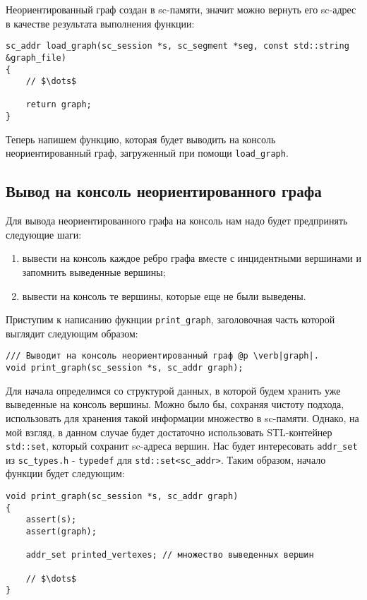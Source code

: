 Неориентированный граф создан в sc-памяти, значит можно вернуть его
sc-адрес в качестве результата выполнения функции:
\begin{lstlisting}[texcl]
sc_addr load_graph(sc_session *s, sc_segment *seg, const std::string &graph_file)
{
    // $\dots$

    return graph;
}
\end{lstlisting}

Теперь напишем функцию, которая будет выводить на консоль
неориентированный граф, загруженный при помощи \lstinline|load_graph|.

\subsection{Вывод на консоль неориентированного графа}
\label{sec:libscprg_print_graph}

Для вывода неориентированного графа на консоль нам надо будет
предпринять следующие шаги:
\begin{enumerate}
\item вывести на консоль каждое ребро графа вместе с инцидентными
  вершинами и запомнить выведенные вершины;
\item вывести на консоль те вершины, которые еще не были выведены.
\end{enumerate}

Приступим к написанию фукнции \lstinline|print_graph|, заголовочная
часть которой выглядит следующим образом:
\begin{lstlisting}[texcl]
/// Выводит на консоль неориентированный граф @p \verb|graph|.
void print_graph(sc_session *s, sc_addr graph);
\end{lstlisting}

Для начала определимся со структурой данных, в которой будем хранить
уже выведенные на консоль вершины. Можно было бы, сохраняя чистоту
подхода, использовать для хранения такой информации множество в
sc-памяти. Однако, на мой взгляд, в данном случае будет достаточно
использовать STL-контейнер \lstinline|std::set|, который сохранит
sc-адреса вершин. Нас будет интересовать \lstinline|addr_set| из
\verb|sc_types.h| - \lstinline|typedef| для
\lstinline|std::set<sc_addr>|. Таким образом, начало функции будет
следующим:
\begin{lstlisting}[texcl]
void print_graph(sc_session *s, sc_addr graph)
{
    assert(s);
    assert(graph);

    addr_set printed_vertexes; // множество выведенных вершин

    // $\dots$
}
\end{lstlisting}

